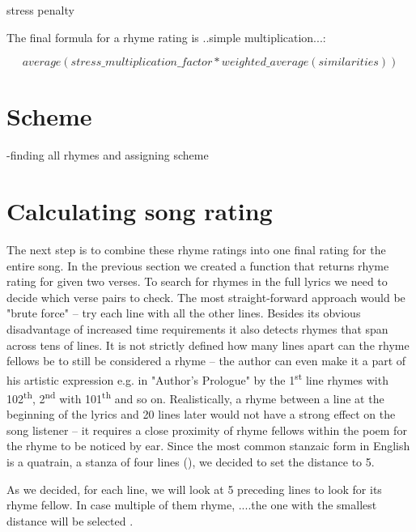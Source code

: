 stress penalty


The final formula for a rhyme rating is ..simple multiplication...:

\[average(stress\_multiplication\_factor*weighted\_average(similarities))\]

\section{Scheme}
-finding all rhymes and assigning scheme
\section{Calculating song rating}

The next step is to combine these rhyme ratings into one final rating for the entire song. In the previous section we created a function that returns rhyme rating for given two verses. To search for rhymes in the full lyrics we need to decide which verse pairs to check. The most straight-forward approach would be "brute force" -- try each line with all the other lines. Besides its obvious disadvantage of increased time requirements it also detects rhymes that span across tens of lines. It is not strictly defined how many lines apart can the rhyme fellows be to still be considered a rhyme -- the author can even make it a part of his artistic expression  e.g. in "Author's Prologue" by \cite{thomas1952author} the 1\textsuperscript{st} line rhymes with 102\textsuperscript{th}, 2\textsuperscript{nd} with 101\textsuperscript{th} and so on. Realistically, a rhyme between a line at the beginning of the lyrics and 20 lines later would not have a strong effect on the song listener -- it requires a close proximity of rhyme fellows within the poem for the rhyme to be noticed by ear. Since the most common stanzaic form in English is a quatrain, a stanza of four lines (\cite{eastman1970norton}), we decided to set the distance to 5. 


As we decided, for each line, we will look at 5 preceding lines to look for its rhyme fellow. In case multiple of them rhyme, ....the one with the smallest distance will be selected .

